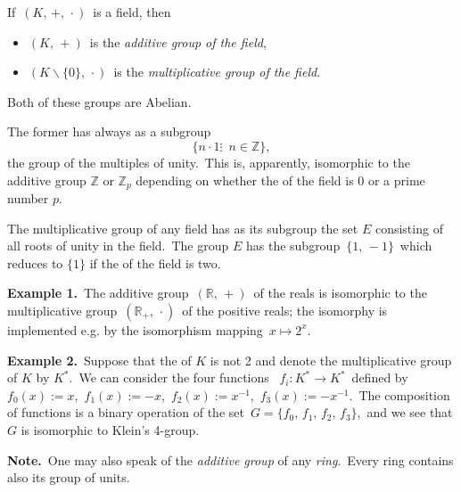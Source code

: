 \documentclass[12pt]{article}
\begin{document}
If \,$(K,\,+,\,\cdot)$\, is a field, then
\begin{itemize}
\item $(K,\,+)$ \,is the {\em additive group of the field},
\item $(K\!\smallsetminus\!\{0\},\,\cdot)$ \,is the {\em multiplicative group of the field}.
\end{itemize}
Both of these groups are Abelian.

The former has always as a subgroup 
          $$\{n\!\cdot\!1\vdots \,\,\,n\in\mathbb{Z}\},$$
the group of the multiples of unity.\, This is, apparently, isomorphic to 
the additive group $\mathbb{Z}$ or $\mathbb{Z}_p$ depending on whether the  of the field is 0 or a prime number $p$.

The multiplicative group of any field has as its subgroup the set $E$ consisting of all roots of unity in the field.\, The group $E$ has the subgroup\, $\{1,\,-1\}$\, which reduces to $\{1\}$ if the  of the field is two.\, 


\textbf{Example 1.}\, The additive group\, $(\mathbb{R},\,+)$\, of the reals is isomorphic to the multiplicative group\, $(\mathbb{R}_+,\,\cdot)$\, of the positive reals; the isomorphy is implemented e.g. by the isomorphism mapping \,$x\mapsto 2^x$.

\textbf{Example 2.}\, Suppose that the  of $K$ is not 2 and denote the multiplicative group of $K$ by $K^*$.\, We can consider the four functions \, $f_i\!:K^*\!\to\!K^*$\, defined by\, $f_0(x) := x$,\, 
$f_1(x) := -x$,\, $f_2(x) := x^{-1}$,\, $f_3(x) := -x^{-1}$.\, The composition of functions is a binary operation of the set\, $G = \{f_0,\,f_1,\,f_2,\,f_3\}$,\, and we see that $G$ is isomorphic to Klein's 4-group.

\textbf{Note.}\, One may also speak of the {\em additive group} of any {\em ring}.\, Every ring contains also its group of units.
\end{document}
